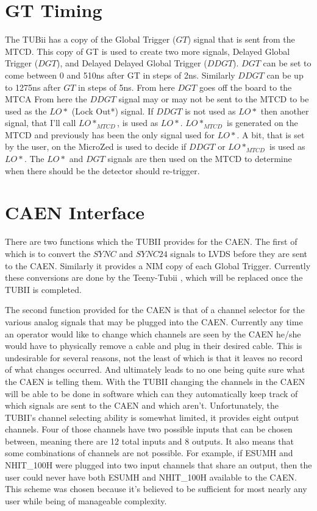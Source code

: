 \documentclass[11pt,a4paper]{article}
\begin{document}
\section{GT Timing}
\label{GTTiming}
The TUBii has a copy of the Global Trigger ($GT$) signal that is sent from the MTCD. This copy of GT is used to create two more signals, Delayed Global Trigger ($DGT$), and Delayed Delayed Global Trigger ($DDGT$). $DGT$ can be set to come between 0 and 510ns after GT in steps of 2ns. Similarly $DDGT$ can be up to 1275ns after $GT$ in steps of 5ns. From here $DGT$ goes off the board to the MTCA  From here the $DDGT$ signal may or may not be sent to the MTCD to be used as the $LO*$ (Lock Out*) signal. If $DDGT$ is not used as $LO*$ then another signal, that I'll call $LO*_{MTCD}$, is used as $LO*$. $LO*_{MTCD}$ is generated on the MTCD and previously has been the only signal used for $LO*$. A bit, that is set by the user, on the MicroZed is used to decide if $DDGT$ or $LO*_{MTCD}$ is used as $LO*$. 
The $LO*$ and $DGT$ signals are then used on the MTCD to determine when there should be the detector should re-trigger.
 
\section{CAEN Interface}
There are two functions which the TUBII provides for the CAEN. The first of which is to convert the $SYNC$ and $SYNC24$ signals to LVDS before they are sent to the CAEN. Similarly it provides a NIM copy of each Global Trigger. Currently these conversions are done by the Teeny-Tubii \cite{ElectronicsUpdate}, which will be replaced once the TUBII is completed. 

 The second function provided for the CAEN is that of a channel selector for the various analog signals that may be plugged into the CAEN. Currently any time an operator would like to change which channels are seen by the CAEN he/she would have to physically remove a cable and plug in their desired cable. This is undesirable for several reasons, not the least of which is that it leaves no record of what changes occurred. And ultimately leads to no one being quite sure what the CAEN is telling them. With the TUBII changing the channels in the CAEN will be able to be done in software which can they automatically keep track of which signals are sent to the CAEN and which aren't. Unfortunately, the TUBII's channel selecting ability is somewhat limited, it provides eight output channels. Four of those channels have two possible inputs that can be chosen between, meaning there are 12 total inputs and 8 outputs. It also means that some combinations of channels are not possible. For example, if ESUMH and NHIT\_100H were plugged into two input channels that share an output, then the user could never have both ESUMH and NHIT\_100H available to the CAEN. This scheme was chosen because it's believed to be sufficient for most nearly any user while being of manageable complexity.
 
\end{document}
